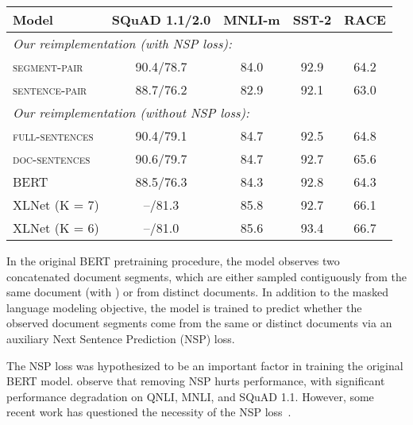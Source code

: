 \documentclass[11pt]{article}
\newcommand{\bertbase}{BERT}
\newcommand{\xlnetbase}{XLNet}
\begin{document}
\begin{table*}[t]
\begin{center}
\begin{tabular}{lcccc}
\toprule
\bf Model & \bf SQuAD 1.1/2.0 & \bf MNLI-m & \bf SST-2 & \bf RACE \\ 
\midrule
\multicolumn{5}{l}{\emph{Our reimplementation (with NSP loss):}} \\
\textsc{segment-pair} & 90.4/78.7 & 84.0 & 92.9 & 64.2 \\
\textsc{sentence-pair} & 88.7/76.2 & 82.9 & 92.1 & 63.0 \\
\midrule
\multicolumn{5}{l}{\emph{Our reimplementation (without NSP loss):}} \\
\textsc{full-sentences} & 90.4/79.1 & 84.7 & 92.5 & 64.8 \\
\textsc{doc-sentences} & 90.6/79.7 & 84.7 & 92.7 & 65.6 \\
\midrule
\bertbase{} & 88.5/76.3 & 84.3 & 92.8 & 64.3 \\
\xlnetbase{} (K = 7) & --/81.3 & 85.8 & 92.7 & 66.1 \\
\xlnetbase{} (K = 6) & --/81.0 & 85.6 & 93.4 & 66.7 \\
\bottomrule



\end{tabular}
\end{center}
\caption{
Development set results for base models pretrained over \textsc{BookCorpus} and \textsc{Wikipedia}.
All models are trained for 1M steps with a batch size of 256 sequences.
We report F1 for SQuAD and accuracy for MNLI-m, SST-2 and RACE.
Reported results are medians over five random initializations (seeds).
Results for \bertbase{} and \xlnetbase{} are from .
}
\label{tab:base_apples_to_apples}
\end{table*} 
In the original BERT pretraining procedure, the model observes two concatenated document segments, which are either sampled contiguously from the same document (with ) or from distinct documents.
In addition to the masked language modeling objective, the model is trained to predict whether the observed document segments come from the same or distinct documents via an auxiliary Next Sentence Prediction (NSP) loss.

The NSP loss was hypothesized to be an important factor in training the original BERT model.  observe that removing NSP hurts performance, with significant performance degradation on QNLI, MNLI, and SQuAD 1.1.
However, some recent work has questioned the necessity of the NSP loss~\cite{lample2019cross,yang2019xlnet,joshi2019spanbert}.
\end{document}

